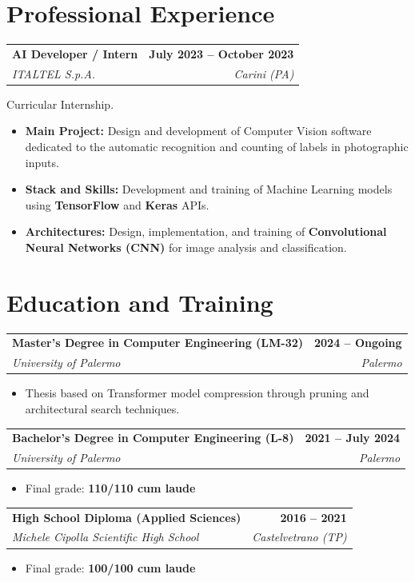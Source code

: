 \documentclass[11pt, a4paper]{article}
\makeatletter
\newcommand{\resumeItem}[4]{
  \vspace{1.5mm}
  \noindent
  \begin{tabular*}{\textwidth}{@{}l@{\extracolsep{\fill}}r@{}}
    \textbf{#1} & \textbf{\textcolor{primary}{#2}} \\
    \textit{#3} & \textit{#4} \\
  \end{tabular*}
  \vspace{1mm}
}
\makeatother
\begin{document}
\section{Professional Experience}

\resumeItem{AI Developer / Intern}{July 2023 -- October 2023}{ITALTEL S.p.A.}{Carini (PA)}
Curricular Internship.
\begin{itemize}
    \item \textbf{Main Project:} Design and development of Computer Vision software dedicated to the automatic recognition and counting of labels in photographic inputs.
    \item \textbf{Stack and Skills:} Development and training of Machine Learning models using \textbf{TensorFlow} and \textbf{Keras} APIs.
    \item \textbf{Architectures:} Design, implementation, and training of \textbf{Convolutional Neural Networks (CNN)} for image analysis and classification.
\end{itemize}

\section{Education and Training}

\resumeItem{Master's Degree in Computer Engineering (LM-32)}{2024 -- Ongoing}{University of Palermo}{Palermo}
\vspace{-1.5em}
\begin{itemize}
    \item Thesis based on Transformer model compression through pruning and architectural search techniques.
\end{itemize}

\resumeItem{Bachelor's Degree in Computer Engineering (L-8)}{2021 -- July 2024}{University of Palermo}{Palermo}
\vspace{-1.5em}
\begin{itemize}
    \item Final grade: \textbf{110/110 cum laude}
\end{itemize}

\resumeItem{High School Diploma (Applied Sciences)}{2016 -- 2021}{Michele Cipolla Scientific High School}{Castelvetrano (TP)}
\vspace{-1.5em}
\begin{itemize}
    \item Final grade: \textbf{100/100 cum laude}
\end{itemize}
\end{document}
